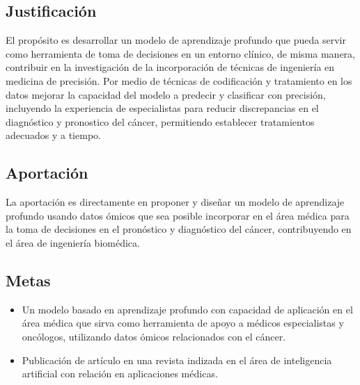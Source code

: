 \subsection{Justificación}


El propósito es desarrollar un modelo de aprendizaje profundo que pueda servir como herramienta de toma de decisiones en un entorno clínico, de misma manera, contribuir en la investigación de la incorporación de técnicas de ingeniería en medicina de precisión. Por medio de técnicas de codificación y tratamiento en los datos mejorar la capacidad del modelo a predecir y clasificar con precisión, incluyendo la experiencia de especialistas para reducir discrepancias en el diagnóstico y pronostico del cáncer, permitiendo establecer tratamientos adecuados y a tiempo.

\subsection{Aportación}

La aportación es directamente en proponer y diseñar un modelo de aprendizaje profundo usando datos ómicos que sea posible incorporar en el área médica para la toma de decisiones en el pronóstico y diagnóstico del cáncer, contribuyendo en el área de ingeniería biomédica.
\subsection{Metas}

\begin{itemize}

    \addtolength{\itemsep}{-4mm} %
        
         \item Un modelo basado en aprendizaje profundo con capacidad de aplicación en el área médica que sirva como herramienta de apoyo a médicos especialistas y oncólogos, utilizando datos ómicos relacionados con el cáncer.

         \item Publicación de artículo en una revista indizada en el área de inteligencia artificial con relación en aplicaciones médicas.
         
\end{itemize}
         


